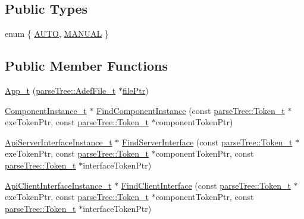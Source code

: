 \subsection*{Public Types}
\begin{DoxyCompactItemize}
\item 
enum \{ \hyperlink{structmodel_1_1_app__t_a76e6248e0db08be7683cf0eedbf7005da701e541d386e264616ea7feee631393e}{A\+U\+TO}, 
\hyperlink{structmodel_1_1_app__t_a76e6248e0db08be7683cf0eedbf7005da8c81363fab5fb67592c9b94b2bbb165a}{M\+A\+N\+U\+AL}
 \}
\end{DoxyCompactItemize}
\subsection*{Public Member Functions}
\begin{DoxyCompactItemize}
\item 
\hyperlink{structmodel_1_1_app__t_a44d5873d26d4ae2f124c11c34b3ced34}{App\+\_\+t} (\hyperlink{structparse_tree_1_1_adef_file__t}{parse\+Tree\+::\+Adef\+File\+\_\+t} $\ast$\hyperlink{update_daemon_8c_acf1f3d914b42896a64e8683abe22ae7a}{file\+Ptr})
\item 
\hyperlink{structmodel_1_1_component_instance__t}{Component\+Instance\+\_\+t} $\ast$ \hyperlink{structmodel_1_1_app__t_ac6b494ce9f122e9e3c84783c5f89f0c6}{Find\+Component\+Instance} (const \hyperlink{structparse_tree_1_1_token__t}{parse\+Tree\+::\+Token\+\_\+t} $\ast$exe\+Token\+Ptr, const \hyperlink{structparse_tree_1_1_token__t}{parse\+Tree\+::\+Token\+\_\+t} $\ast$component\+Token\+Ptr)
\item 
\hyperlink{structmodel_1_1_api_server_interface_instance__t}{Api\+Server\+Interface\+Instance\+\_\+t} $\ast$ \hyperlink{structmodel_1_1_app__t_a8eca84b336a6f8f95b297421c3d2db10}{Find\+Server\+Interface} (const \hyperlink{structparse_tree_1_1_token__t}{parse\+Tree\+::\+Token\+\_\+t} $\ast$exe\+Token\+Ptr, const \hyperlink{structparse_tree_1_1_token__t}{parse\+Tree\+::\+Token\+\_\+t} $\ast$component\+Token\+Ptr, const \hyperlink{structparse_tree_1_1_token__t}{parse\+Tree\+::\+Token\+\_\+t} $\ast$interface\+Token\+Ptr)
\item 
\hyperlink{structmodel_1_1_api_client_interface_instance__t}{Api\+Client\+Interface\+Instance\+\_\+t} $\ast$ \hyperlink{structmodel_1_1_app__t_a7491950555584e5f07eb084494d58657}{Find\+Client\+Interface} (const \hyperlink{structparse_tree_1_1_token__t}{parse\+Tree\+::\+Token\+\_\+t} $\ast$exe\+Token\+Ptr, const \hyperlink{structparse_tree_1_1_token__t}{parse\+Tree\+::\+Token\+\_\+t} $\ast$component\+Token\+Ptr, const \hyperlink{structparse_tree_1_1_token__t}{parse\+Tree\+::\+Token\+\_\+t} $\ast$interface\+Token\+Ptr)

\end{DoxyCompactItemize}

